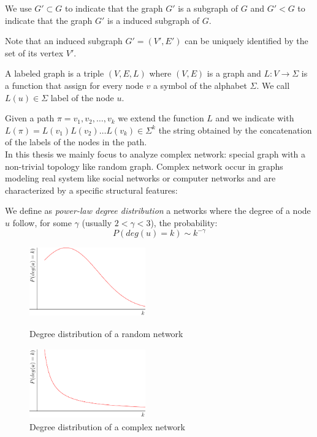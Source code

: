 We use $G' \subset G$ to indicate that the graph $G'$ is a subgraph of $G$ and $G' < G$ to indicate that the graph $G'$ is a induced subgraph of $G$.

Note that an induced subgraph $G' = (V', E')$ can be uniquely identified by the set of its vertex $V'$.\\

\begin{definizione}\label{def:labeledgraph}
	A labeled graph is a triple $(V,E,L)$ where $(V,E)$ is a graph and $L : V \rightarrow \Sigma$
	is a function that assign for every node $v$ a symbol of the alphabet $\Sigma$. We call $L(u) \in \Sigma$ label of the node $u$.
\end{definizione}

Given a path $\pi = v_{1}, v_{2}, \ldots, v_{k}$ we extend the function $L$ and we indicate with $L(\pi) = L(v_{1}) L(v_{2}) \ldots L(v_{k}) \in \Sigma^{k}$ the string obtained by the concatenation of the labels of the nodes in the path.\\

In this thesis we mainly focus to analyze complex network: special graph with a non-trivial topology like random graph. Complex network occur in graphs modeling real system like social networks or computer networks and are characterized by a specific structural features:

\begin{definizione}\label{def:power-law-graph}
	We define as \textit{power-law degree distribution} a networks where the degree of a node $u$ follow, for some $\gamma$ (usually $2 < \gamma < 3$), the probability:
	\begin{equation}
		P(deg(u) = k) \sim k^{-\gamma}  
	\end{equation}
\end{definizione}

\begin{figure}[h]
	\centering
	\begin{minipage}[t]{.45\textwidth}
		\centering
		\includegraphics[width=5cm,height=3cm]{figure/figure-1-1} %
		\caption{Degree distribution of a random network}
	\end{minipage}\hfill
	\begin{minipage}[t]{.45\textwidth}
		\centering 
		\includegraphics[width=5cm,height=3cm]{figure/figure-1-2} %
		\caption{Degree distribution of a complex network}
	\end{minipage}
\end{figure}

